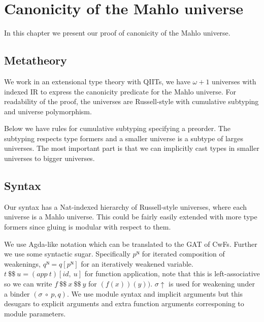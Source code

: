 \chapter{Canonicity of the Mahlo universe}

In this chapter we present our proof of canonicity of the Mahlo universe.

\section{Metatheory}

We work in an extensional type theory with QIITs, we have $\omega+1$ universes with indexed IR \cite{dybjer2006indexed} to express the canonicity predicate for the Mahlo universe. For readability of the proof, the universes are Russell-style with cumulative subtyping and universe polymorphism.

Below we have rules for cumulative subtyping specifying a preorder. The subtyping respects type formers and a smaller universe is a subtype of larges universes. The most important part is that we can implicitly cast types in smaller universes to bigger universes.


\section{Syntax}

Our syntax has a Nat-indexed hierarchy of Russell-style universes, where each universe is a Mahlo universe. This could be fairly easily extended with more type formers since gluing is modular with respect to them.

We use Agda-like notation which can be translated to the GAT of CwFs. Further we use some syntactic sugar. Specifically $pᴺ$ for iterated composition of weakenings, $qᴺ=q[pᴺ]$ for an iteratively weakened variable. $t\ \$\$\ u = (app\ t)[id,\ u]$ for function application, note that this is left-associative so we can write $f\ \$\$\ x\ \$\$\ y$ for $(f (x))(y))$. $σ↑$ is used for weakening under a binder $(σ\ ∘\ p, q)$. We use module syntax and implicit arguments but this desugars to explicit arguments and extra function arguments corresponing to module parameters.

